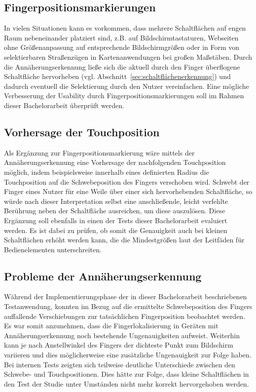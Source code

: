 \documentclass[12pt,numbers=noenddot,parskip,bibliography=totocnumbered,listof=totocnumbered]{scrreprt}
\begin{document}
\subsection{Fingerpositionsmarkierungen}
In vielen Situationen kann es vorkommen, dass mehrere Schaltflächen auf engen Raum nebeneinander platziert sind, z.B. auf Bildschirmtastaturen, Webseiten ohne Größenanpassung auf entsprechende Bildschirmgrößen oder in Form von selektierbaren Straßenzügen in Kartenanwendungen bei großen Maßstäben. Durch die Annäherungserkennung ließe sich die aktuell durch den Finger überflogene Schaltfläche hervorheben (vgl. Abschnitt~\ref{sec:schaltflächenerkennung}) und dadurch eventuell die Selektierung durch den Nutzer vereinfachen. Eine mögliche Verbesserung der Usability durch Fingerpositionsmarkierungen soll im Rahmen dieser Bachelorarbeit überprüft werden.

\subsection{Vorhersage der Touchposition}
Als Ergänzung zur Fingerpositionsmarkierung wäre mittels der Annäherungserkennung eine Vorhersage der nachfolgenden Touchposition möglich, indem beispielsweise innerhalb eines definierten Radius die Touchposition auf die Schwebeposition des Fingers verschoben wird. Schwebt der Finger eines Nutzer für eine Weile über einer sich hervorhebenden Schaltfläche, so würde nach dieser Interpretation selbst eine anschließende, leicht verfehlte Berührung neben der Schaltfläche ausreichen, um diese auszulösen. Diese Ergänzung soll ebenfalls in einen der Tests dieser Bachelorarbeit evaluiert werden. Es ist dabei zu prüfen, ob somit die Genauigkeit auch bei kleinen Schaltflächen erhöht werden kann, die die Mindestgrößen laut der Leitfäden für Bedienelementen unterschreiten.

\subsection{Probleme der Annäherungserkennung}\label{sec:kalibrierung}
Während der Implementierungsphase der in dieser Bachelorarbeit beschriebenen Testanwendung, konnten im Bezug auf die ermittelte Schwebeposition des Fingers auffallende Verschiebungen zur tatsächlichen Fingerposition beobachtet werden. Es war somit anzunehmen, dass die Fingerlokalisierung in Geräten mit Annäherungserkennung noch bestehende Ungenauigkeiten aufweist. Weiterhin kann je nach Anstellwinkel des Fingers der dichteste Punkt zum Bildschirm variieren und dies möglicherweise eine zusätzliche Ungenauigkeit zur Folge haben. Bei internen Tests zeigten sich teilweise deutliche Unterschiede zwischen den Schwebe- und Touchpositionen. Dies hätte zur Folge, dass kleine Schaltflächen in den Test der Studie unter Umständen nicht mehr korrekt hervorgehoben werden.
\end{document}
